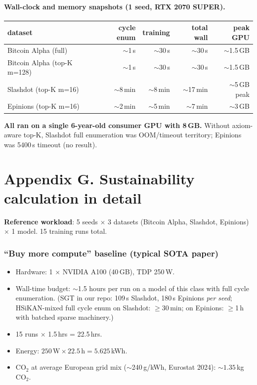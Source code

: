 \documentclass[11pt,a4paper]{article}
\begin{document}
\paragraph{Wall-clock and memory snapshots (1 seed, RTX 2070 SUPER).}

\begin{center}
\begin{tabular}{l r r r r}
\toprule
dataset      & cycle enum & training & total wall & peak GPU \\
\midrule
Bitcoin Alpha (full)      & $\sim$1\,s     & $\sim$30\,s   & $\sim$30\,s   & $\sim$1.5\,GB \\
Bitcoin Alpha (top-K m=128) & $\sim$1\,s   & $\sim$30\,s   & $\sim$30\,s   & $\sim$1.5\,GB \\
Slashdot (top-K m=16)     & $\sim$8\,min   & $\sim$8\,min  & $\sim$17\,min & $\sim$5\,GB peak \\
Epinions (top-K m=16)     & $\sim$2\,min   & $\sim$5\,min  & $\sim$7\,min  & $\sim$3\,GB \\
\bottomrule
\end{tabular}
\end{center}

\textbf{All ran on a single 6-year-old consumer GPU with 8\,GB.}
Without axiom-aware top-K, Slashdot full enumeration was OOM/timeout
territory; Epinions was 5400\,s timeout (no result).

\section*{Appendix G. Sustainability calculation in detail}

\textbf{Reference workload}: 5 seeds $\times$ 3 datasets (Bitcoin
Alpha, Slashdot, Epinions) $\times$ 1 model. 15 training runs total.

\subsubsection*{``Buy more compute'' baseline (typical SOTA paper)}
\begin{itemize}
\item Hardware: 1 $\times$ NVIDIA A100 (40\,GB), TDP 250\,W.
\item Wall-time budget: $\sim$1.5 hours per run on a model of this
      class with full cycle enumeration. (SGT in our repo: 109\,s
      Slashdot, 180\,s Epinions \emph{per seed}; HSiKAN-mixed full
      cycle enum on Slashdot: $\geq$30\,min; on Epinions: $\geq$1\,h
      with batched sparse machinery.)
\item 15 runs $\times$ 1.5\,hrs = 22.5\,hrs.
\item Energy: $250 \,\text{W} \times 22.5\,\text{h} = 5.625$\,kWh.
\item CO$_2$ at average European grid mix ($\sim$240\,g/kWh,
      Eurostat 2024): $\sim 1.35$\,kg CO$_2$.
\end{itemize}
\end{document}
